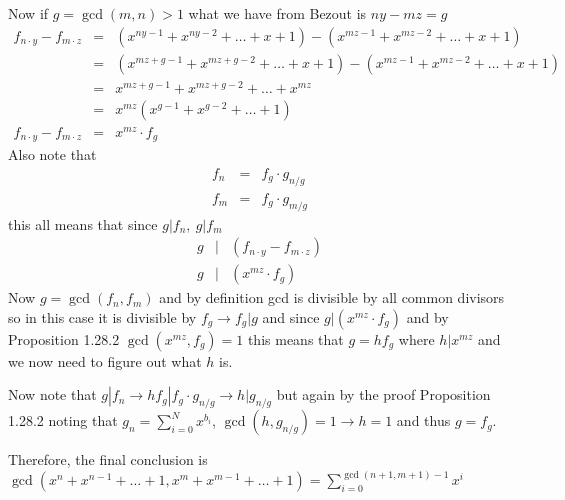 \documentclass[aps,preprint,preprintnumbers,nofootinbib,showpacs,prd]{revtex4-1}
\newcommand{\nbea}{\begin{eqnarray*}}
\newcommand{\neea}{\end{eqnarray*}}
\begin{document}
Now if $g = \gcd(m,n) > 1$ what we have from Bezout is $ny - mz = g$
%
\nbea
f_{n\cdot y} - f_{m\cdot z} & = & (x^{ny-1} + x^{ny-2} + \ldots + x + 1) - (x^{mz-1} + x^{mz-2} + \ldots + x + 1) \\
& = & (x^{mz+g-1} + x^{mz+g-2} + \ldots + x + 1) - (x^{mz-1} + x^{mz-2} + \ldots + x + 1) \\
& = & x^{mz+g-1} + x^{mz+g-2} + \ldots + x^{mz} \\
& = & x^{mz}\left ( x^{g-1} + x^{g-2} + \ldots + 1 \right ) \\
f_{n\cdot y} - f_{m\cdot z} & = & x^{mz} \cdot f_g
\neea
%
Also note that
%
\nbea
f_{n} & = & f_g\cdot g_{n/g} \\
f_{m} & = & f_g\cdot g_{m/g}
\neea
%
this all means that since $g|f_n, ~g|f_m$
%
\nbea
g &|& \left(f_{n\cdot y} - f_{m\cdot z}\right) \\
g &|& \left(x^{mz} \cdot f_g\right)
\neea
%
Now $g=\gcd(f_n,f_m)$ and by definition gcd is divisible by all common divisors so in this case it is divisible by $f_g \to f_g|g$ and since $g | (x^{mz} \cdot f_g)$ and by Proposition 1.28.2 $\gcd(x^{mz}, f_g)=1$ this means that $g = hf_g$ where $h|x^{mz}$ and we now need to figure out what $h$ is.

Now note that $g|f_n \to h f_g| f_g\cdot g_{n/g} \to h | g_{n/g}$ but again by the proof Proposition 1.28.2 noting that $g_n = \sum_{i=0}^{N} x^{b_i}$, $\gcd(h,g_{n/g})=1 \to h=1$ and thus $g = f_g$.

Therefore, the final conclusion is $\gcd(x^n + x^{n-1} + \ldots + 1,x^m + x^{m-1} + \ldots + 1) = \sum_{i=0}^{\gcd(n+1,m+1)-1}x^{i}$
\end{document}
